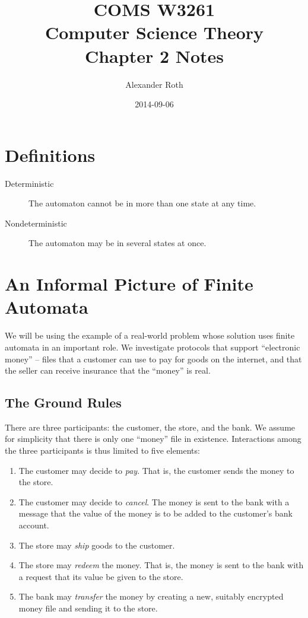 \documentclass[]{article}
\begin{document}
\title{COMS W3261 \\ Computer Science Theory \\ Chapter 2 Notes}
\author{Alexander Roth}
\date{2014-09-06}
\maketitle

\section*{Definitions}
  \begin{description}
    \item[Deterministic] The automaton cannot be in more than one state at any
    time.
    \item[Nondeterministic] The automaton may be in several states at once.
  \end{description}

\section*{An Informal Picture of Finite Automata}
  We will be using the example of a real-world problem whose solution uses
  finite automata in an important role. We investigate protocols that support
  ``electronic money'' -- files that a customer can use to pay for goods on
  the internet, and that the seller can receive insurance that the ``money''
  is real.

  \subsection*{The Ground Rules}
    There are three participants: the customer, the store, and the bank. We
    assume for simplicity that there is only one ``money'' file in existence.
    Interactions among the three participants is thus limited to five
    elements:
    \begin{enumerate}
      \item The customer may decide to \emph{pay}. That is, the customer sends
      the money to the store.
      \item The customer may decide to \emph{cancel}. The money is sent to the
      bank with a message that the value of the money is to be added to the
      customer's bank account.
      \item The store may \emph{ship} goods to the customer.
      \item The store may \emph{redeem} the money. That is, the money is sent
      to the bank with a request that its value be given to the store.
      \item The bank may \emph{transfer} the money by creating a new, suitably
      encrypted money file and sending it to the store.
    \end{enumerate}
\end{document}
